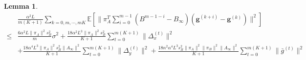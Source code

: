 \documentclass{article}
\newtheorem{lemma}[thm]{Lemma}
\newcommand{\vg}{{\mathbf{g}}}
\newcommand{\EE}[1]{\mathbb{E}\left[#1\right]}
\newcommand{\norm}[1]{\| #1 \|}
\begin{document}
\begin{lemma}\label{Convergence Analysis: Quadratic Term-Decomposition-3}
  \begin{align*}
    &\frac{\alpha^2L}{m(K+1)}\sum_{k=0,m,\cdots,mK}\EE{\norm{\pi_A^{T}\sum_{i=0}^{m-1}(B^{m-1-i}-B_{\infty})(\vg^{(k+i)}-\vg^{(k)})}^2}\\
    \leq& \frac{6\alpha^2L\norm{\pi_A}^2s_B^2}{m}\sigma^2+\frac{18\alpha^2L^3\norm{\pi_A}^2s_B^2}{ K+1}\sum_{t=0}^{m(K+1)}\norm{\Delta_x^{(t)}}^2\\&+\frac{18\alpha^4L^3\norm{\pi_A}^2s_B^2\norm{A_{\infty}}^2}{ K+1}\sum_{t=0}^{m(K+1)}\norm{\Delta_y^{(t)}}^2+\frac{18n^2\alpha^4L^3s_B^2\norm{\pi_A}^2\norm{\pi_B}^2\norm{A_{\infty}}^2}{ K+1}\sum_{t=0}^{m(K+1)}\norm{\bar{g}^{(t)}}^2
  \end{align*}
\end{lemma}
\end{document}
